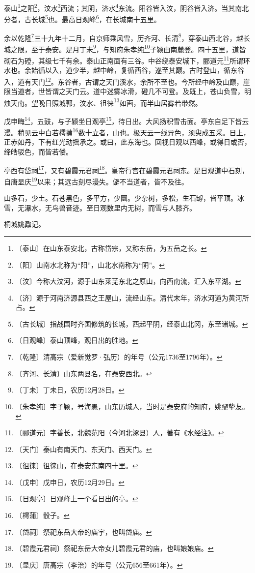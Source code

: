 \documentclass[12pt,UTF-8,openany]{ctexbook}
\begin{document}
\begin{normalsize}
    
    泰山\footnote{〔泰山〕在山东泰安北，古称岱宗，又称东岳，为五岳之长。}之阳\footnote{〔阳〕山南水北称为“阳”，山北水南称为“阴”。}，汶水\footnote{〔汶〕今称大汶河，源于山东莱芜东北之原山，向西南流，汇入东平湖。}西流；其阴，济水\footnote{〔济〕源于河南济源县西之王屋山，流经山东。清代末年，济水河道为黄河所占。}东流。阳谷皆入汶，阴谷皆入济。当其南北分者，古长城\footnote{〔古长城〕指战国时齐国修筑的长城，西起平阴，经泰山北冈，东至诸城。}也。最高日观峰\footnote{〔日观峰〕泰山顶峰，观日出的胜地。}，在长城南十五里。
    
    余以乾隆\footnote{〔乾隆〕清高宗（爱新觉罗·弘历）的年号（公元1736至1796年）。}三十九年十二月，自京师乘风雪，历齐河、长清\footnote{〔齐河、长清〕山东两县名，在泰安西北。}，穿泰山西北谷，越长城之限，至于泰安。是月丁未\footnote{〔丁未〕丁未日，农历12月28日。}，与知府朱孝纯\footnote{〔朱孝纯〕字子颖，号海愚，山东历城人，当时是泰安府的知府，姚鼐挚友。}子颍由南麓登。四十五里，道皆砌石为磴，其级七千有余。泰山正南面有三谷。中谷绕泰安城下，郦道元\footnote{〔郦道元〕字善长，北魏范阳（今河北涿县）人，著有《水经注》。}所谓环水也。余始循以入，道少半，越中岭，复循西谷，遂至其巅。古时登山，循东谷入，道有天门\footnote{〔天门〕泰山有南天门、东天门、西天门。}。东谷者，古谓之天门溪水，余所不至也。今所经中岭及山巅，崖限当道者，世皆谓之天门云。道中迷雾冰滑，磴几不可登。及既上，苍山负雪，明烛天南。望晚日照城郭，汶水、徂徕\footnote{〔徂徕〕徂徕山，在泰安东南四十里。}如画，而半山居雾若带然。
    
    戊申晦\footnote{〔戊申〕戊申日，农历12月29日。}，五鼓，与子颍坐日观亭\footnote{〔日观亭〕日观峰上一个看日出的亭。}，待日出。大风扬积雪击面。亭东自足下皆云漫。稍见云中白若樗蒱\footnote{〔樗蒲〕骰子。}数十立者，山也。极天云一线异色，须臾成五采。日上，正赤如丹，下有红光动摇承之。或曰，此东海也。回视日观以西峰，或得日或否，绛皓驳色，而皆若偻。
    
    亭西有岱祠\footnote{〔岱祠〕祭祀东岳大帝的庙宇，也叫岱庙。}，又有碧霞元君祠\footnote{〔碧霞元君祠〕祭祀东岳大帝女儿碧霞元君的庙，也叫娘娘庙。}。皇帝行宫在碧霞元君祠东。是日观道中石刻，自唐显庆\footnote{〔显庆〕唐高宗（李治）的年号（公元656至661年）。}以来；其远古刻尽漫失。僻不当道者，皆不及往。
    
    山多石，少土。石苍黑色，多平方，少圜。少杂树，多松，生石罅，皆平顶。冰雪，无瀑水，无鸟兽音迹。至日观数里内无树，而雪与人膝齐。
    
    桐城姚鼐记。
\end{normalsize}
\end{document}
